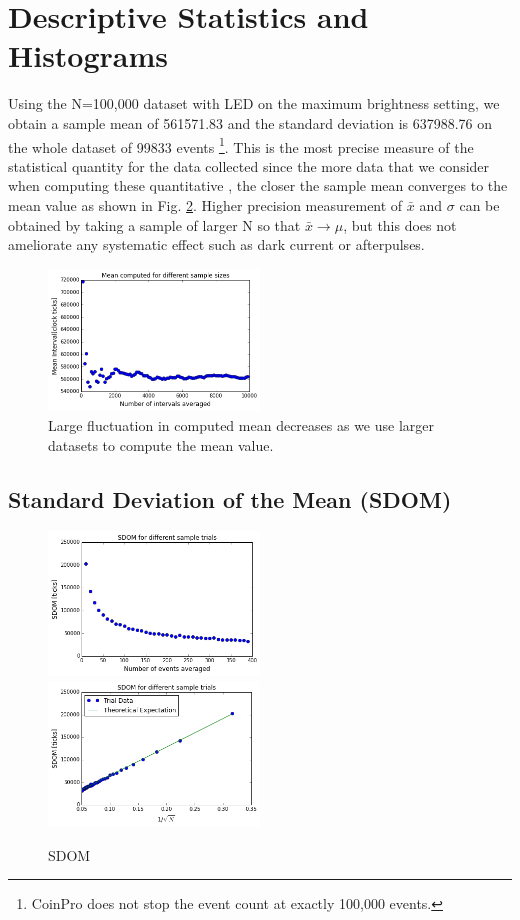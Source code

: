 \documentclass[authoryear, 12pt,5p, times]{elsarticle}
\begin{document}
\section{Descriptive Statistics and Histograms\label{stats}}
Using the N=100,000 dataset with LED on the maximum brightness setting, we obtain a sample mean of 561571.83 and the standard deviation is  637988.76 on the whole dataset of 99833 events \footnote{CoinPro does not stop the event count at exactly 100,000 events.}. This is the most precise measure of the statistical quantity for the data collected since the more data that we consider when computing these quantitative , the closer the sample mean converges to the mean value as shown in Fig. \ref{stat_converging}. Higher precision measurement of $\bar{x} $ and $\sigma$ can be obtained by taking a sample of larger N so that $\bar{x} \rightarrow \mu$, but this does not ameliorate any systematic effect such as dark current or afterpulses.
 	\begin{figure}[h]
		\includegraphics[width=0.5\textwidth]{figures/converging_mean}
		\caption{Large fluctuation in computed mean decreases as we use larger datasets to compute the mean value.}
		\label{stat_converging}
	\end{figure}
	\subsection{Standard Deviation of the Mean (SDOM)}
	 	\begin{figure}[h]
		\includegraphics[width=0.5\textwidth]{figures/sdom_exp_graph}
		\includegraphics[width=0.5\textwidth]{figures/sdom_linear}
		\caption{SDOM}
		\label{stat_converging}
	\end{figure}
\end{document}
